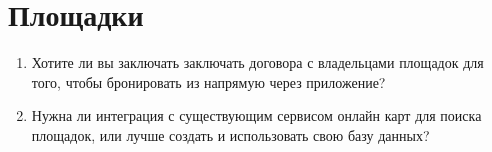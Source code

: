 \documentclass{article}
\newcommand{\red}[1]{\uline{\hspace*{1cm}\textcolor{white}{#1}\hspace*{1cm}}}
\begin{document}
  \section{Площадки}
  \begin{enumerate}[label=\arabic*), resume]
    \item Хотите ли вы заключать заключать договора с владельцами площадок для того, чтобы бронировать из напрямую через приложение?
    \vspace{.2cm} \\ \red{\hspace{10cm}}
    \item Нужна ли интеграция с существующим сервисом онлайн карт для поиска площадок, или лучше создать и использовать свою базу данных?
    \vspace{.2cm} \\ \red{\hspace{10cm}}
  \end{enumerate}
\end{document}
